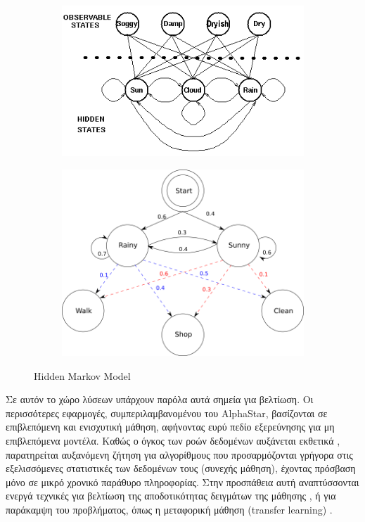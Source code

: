 	\begin{figure}
		\centering
		\begin{subfigure}[t]{0.52\textwidth}
			\includegraphics[width=\textwidth]{figures/hmm}
		\end{subfigure}
		\hfill
		\begin{subfigure}[t]{0.47\textwidth}
			\includegraphics[width=\textwidth]{figures/hmm2}
		\end{subfigure}
		\caption[hidden markov model]{Hidden Markov Model}
		\label{fig:HMM}
	\end{figure}

	Σε αυτόν το χώρο λύσεων υπάρχουν παρόλα αυτά σημεία για βελτίωση.
	Οι περισσότερες εφαρμογές, συμπεριλαμβανομένου του AlphaStar, βασίζονται σε επιβλεπόμενη και ενισχυτική μάθηση,
	αφήνοντας ευρύ πεδίο εξερεύνησης για μη επιβλεπόμενα μοντέλα.
	Καθώς ο όγκος των ροών δεδομένων αυξάνεται εκθετικά \parencite{losingIncrementalOnlineLearning2018},
	παρατηρείται αυξανόμενη ζήτηση για αλγορίθμους που προσαρμόζονται γρήγορα στις εξελισσόμενες στατιστικές των δεδομένων τους (συνεχής μάθηση),
	έχοντας πρόσβαση μόνο σε μικρό χρονικό παράθυρο πληροφορίας.
	Στην προσπάθεια αυτή αναπτύσσονται ενεργά τεχνικές για βελτίωση της αποδοτικότητας δειγμάτων της μάθησης \parencite[όπως][]{nachumDataEfficientHierarchicalReinforcement2018},
	ή για παράκαμψη του προβλήματος, όπως η μεταφορική μάθηση (transfer learning) \parencite{xiongApplicationTransferLearning2018}.
	\medskip

